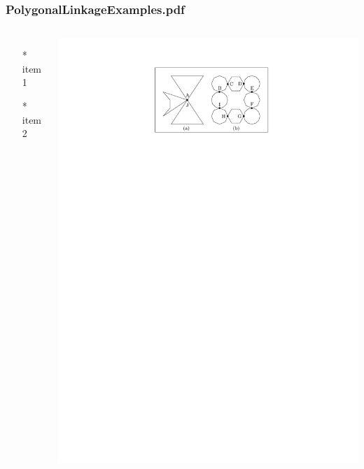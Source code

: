 \begin{frame} \frametitle{PolygonalLinkageExamples.pdf}
    \begin{columns}[c]
        \begin{itemize}
            \item[*] item 1
            \item[*] item 2
        \end{itemize}
        \begin{minipage}{\linewidth}
            \begin{center}
            \includegraphics[width=.9\textwidth]{graphics/PolygonalLinkageExamples.pdf}
            \label{gfx:PolygonalLinkageExamples.pdf}
            \end{center}
        \end{minipage}
    \end{columns}
\end{frame}
